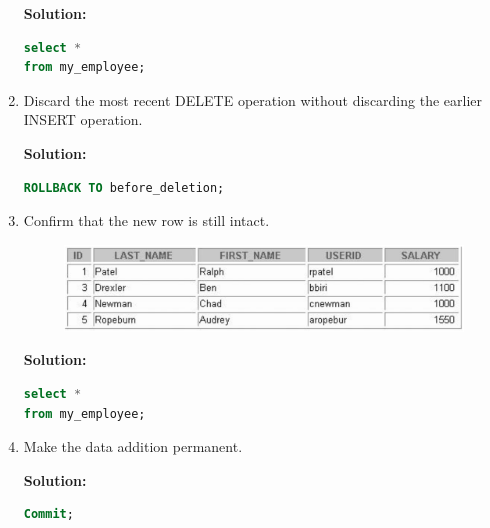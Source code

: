 \begin{enumerate}
    \textbf{Solution: }
    \begin{lstlisting}[language=SQL]
select *
from my_employee;
    \end{lstlisting}
    \item Discard the most recent DELETE operation without discarding the earlier INSERT operation.
    
    \textbf{Solution: }
    \begin{lstlisting}[language=SQL]
ROLLBACK TO before_deletion;
    \end{lstlisting}
    \item Confirm that the new row is still intact.
    \begin{figure}[h]
        \centering
        \includegraphics[width=0.9\linewidth]{graphics/822.png}
    \end{figure}

    \textbf{Solution: }
    \begin{lstlisting}[language=SQL]
select *
from my_employee;
    \end{lstlisting}
    \item Make the data addition permanent.
    
    \textbf{Solution: }
    \begin{lstlisting}[language=SQL]
Commit;
    \end{lstlisting}
\end{enumerate}